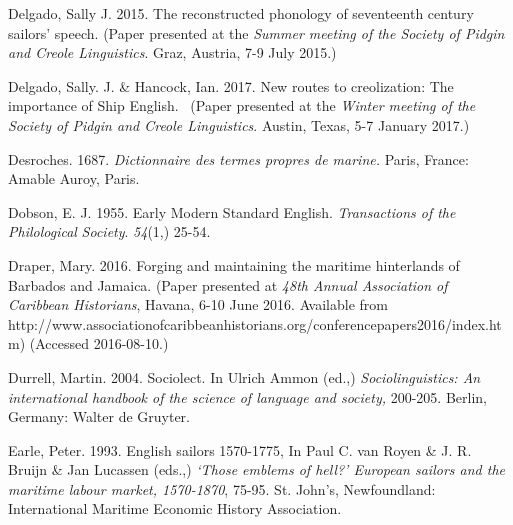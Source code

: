 \begin{styleStandard}
Delgado, Sally J. 2015. The reconstructed phonology of seventeenth century sailors’ speech. (Paper presented at the \textit{Summer meeting of the Society of Pidgin and Creole Linguistics}. Graz, Austria, 7-9 July 2015.) \ \ 
\end{styleStandard}

\begin{styleStandard}
Delgado, Sally. J. \& Hancock, Ian. 2017. New routes to creolization: The importance of Ship English. \ (Paper presented at the \textit{Winter meeting of the Society of Pidgin and Creole Linguistics}. Austin, Texas, 5-7 January 2017.) \ \ 
\end{styleStandard}

\begin{styleStandard}
Desroches. 1687. \textit{Dictionnaire des termes propres de marine. }Paris, France: Amable Auroy, Paris. \ 
\end{styleStandard}

\begin{styleStandard}
Dobson, E. J. 1955. Early Modern Standard English. \textit{Transactions of the Philological} \textit{Society}.\textit{ 54}(1,) 25-54.
\end{styleStandard}

\begin{styleStandard}
Draper, Mary. 2016. Forging and maintaining the maritime hinterlands of Barbados and Jamaica. (Paper presented at \textit{48th Annual Association of Caribbean Historians}, Havana, 6-10 June 2016. Available from http://www.associationofcaribbeanhistorians.org/conferencepapers2016/index.htm) (Accessed 2016-08-10.)
\end{styleStandard}

\begin{styleStandard}
Durrell, Martin. 2004. Sociolect. In Ulrich Ammon (ed.,) \textit{Sociolinguistics: An international handbook of the science of language and society,} 200-205. Berlin, Germany: Walter de Gruyter.
\end{styleStandard}

\begin{styleStandard}
Earle, Peter. 1993. English sailors 1570-1775, In Paul C. van Royen \& J. R. Bruijn \& Jan Lucassen (eds.,) \textit{‘Those emblems of hell?’ European sailors and the maritime labour market, 1570-1870}, 75-95. St. John’s, Newfoundland: International Maritime Economic History Association.
\end{styleStandard}

